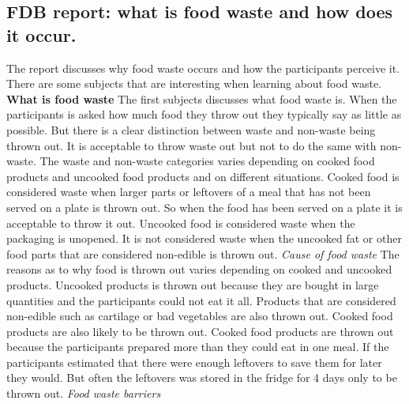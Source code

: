 \subsection{FDB report: what is food waste and how does it occur.}
The report discusses why food waste occurs and how the participants perceive it. There are some subjects that are interesting when learning about food waste. 
\textbf{What is food waste} 
The first subjects discusses what food waste is. When the participants is asked how much food they throw out they typically say as little as possible. But there is a clear distinction between waste and non-waste being thrown out. It is acceptable to throw waste out but not to do the same with non-waste. The waste and non-waste categories varies depending on cooked food products and uncooked food products and on different situations. Cooked food is considered waste when larger parts or leftovers of a meal that has not been served on a plate is thrown out. So when the food has been served on a plate it is acceptable to throw it out. Uncooked food is considered waste when the packaging is unopened. It is not considered waste when the uncooked fat or other food parts that are considered non-edible is thrown out.
\textit{Cause of food waste} 
The reasons as to why food is thrown out varies depending on cooked and uncooked products. Uncooked products is thrown out because they are bought in large quantities and the participants could not eat it all. Products that are considered non-edible such as cartilage or bad vegetables are also thrown out. Cooked food products are also likely to be thrown out. Cooked food products are thrown out because the participants prepared more than they could eat in one meal. If the participants estimated that there were enough leftovers to save them for later they would. But often the leftovers was stored in the fridge for 4 days only to be thrown out.
\textit{Food waste barriers}

